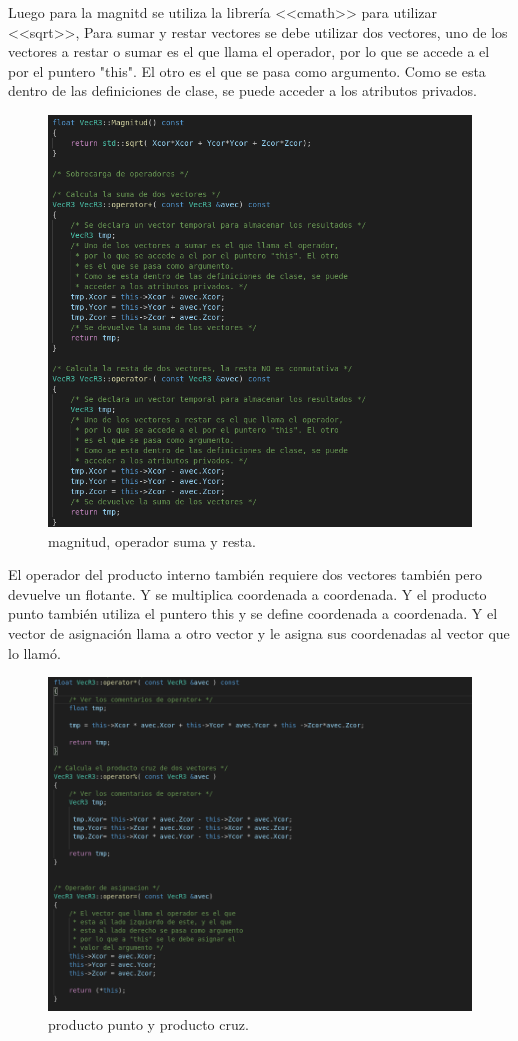 \documentclass[11pt]{article}
\begin{document}
	
	
	Luego para la magnitd se utiliza la librería <<cmath>> para utilizar <<sqrt>>, Para sumar y restar vectores se debe utilizar dos vectores, uno de los vectores a restar o sumar es el que llama el operador, por lo que se accede a el por el puntero "this". El otro es el que se pasa como argumento. Como se esta dentro de las definiciones de clase, se puede acceder a los atributos privados.
	
	
	\begin{figure}[H]
		\centering
		\includegraphics[width=0.7\linewidth]{img5}
		\caption{magnitud, operador suma y resta. }
	\end{figure}

	El operador del	producto interno también requiere dos vectores también pero devuelve un flotante. Y se multiplica coordenada a coordenada. Y el producto punto también utiliza el puntero this y se define coordenada a coordenada. Y el vector de asignación llama a otro vector y le asigna sus coordenadas al vector que lo llamó.
	
	\begin{figure}[H]
		\centering
		\includegraphics[width=0.7\linewidth]{img6}
		\caption{producto punto y producto cruz. }
	\end{figure}
	
\end{document}
